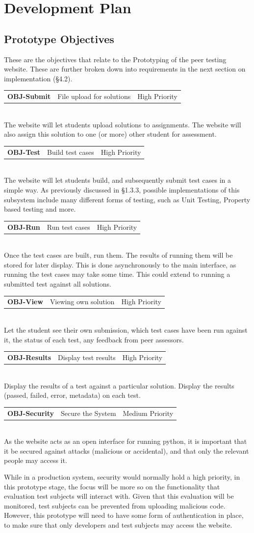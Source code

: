 \documentclass[a4paper,11pt]{report}
\newcommand{\objitem}[4]{\begin{tabularx}{\textwidth}{lXr} \textbf{OBJ-#1} & #2 & #3\end{tabularx}\\#4\\}
\begin{document}

\chapter{Development Plan}
\section{Prototype Objectives}
These are the objectives that relate to the Prototyping of the peer testing website. These are further broken down into requirements in the next section on implementation (\S4.2).
\objitem{Submit}{File upload for solutions}{High Priority}{The website will let students upload solutions to assignments. The website will also assign this solution to one (or more) other student for assessment.}
\objitem{Test}{Build test cases}{High Priority}{The website will let students build, and subsequently submit test cases in a simple way. As previously discussed in \S1.3.3, possible implementations of this subsystem include many different forms of testing, such as Unit Testing, Property based testing and more.}
\objitem{Run}{Run test cases}{High Priority}{Once the test cases are built, run them. The results of running them will be stored for later display. This is done asynchronously to the main interface, as running the test cases may take some time. This could extend to running a submitted test against all solutions.}
\objitem{View}{Viewing own solution}{High Priority}{Let the student see their own submission, which test cases have been run against it, the status of each test, any feedback from peer assessors.}
\objitem{Results}{Display test results}{High Priority}{Display the results of a test against a particular solution. Display the results (passed, failed, error, metadata) on each test.}
\objitem{Security}{Secure the System}{Medium Priority}{As the website acts as an open interface for running python, it is important that it be secured against attacks (malicious or accidental), and that only the relevant people may access it.\par
While in a production system, security would normally hold a high priority, in this prototype stage, the focus will be more so on the functionality that evaluation test subjects will interact with. Given that this evaluation will be monitored, test subjects can be prevented from uploading malicious code. However, this prototype will need to have some form of authentication in place, to make sure that only developers and test subjects may access the website.}
\end{document}

